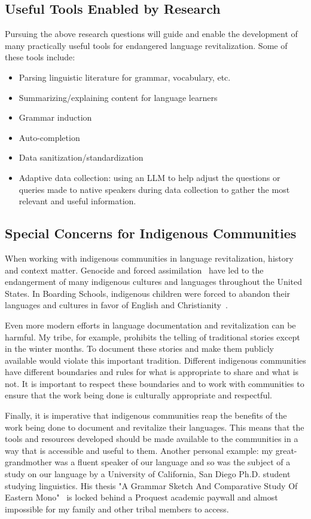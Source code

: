 \documentclass{article}
\begin{document}
\subsection*{Useful Tools Enabled by Research}
Pursuing the above research questions will guide and enable the development of many practically useful tools for endangered language revitalization.
Some of these tools include:
\begin{itemize}
    \item Parsing linguistic literature for grammar, vocabulary, etc.
    \item Summarizing/explaining content for language learners
    \item Grammar induction
    \item Auto-completion
    \item Data sanitization/standardization
    \item Adaptive data collection: using an LLM to help adjust the questions or queries made to native speakers during data collection to gather the most relevant and useful information.
\end{itemize}

\subsection*{Special Concerns for Indigenous Communities}
When working with indigenous communities in language revitalization, history and context matter.
Genocide and forced assimilation~\cite{genocide} have led to the endangerment of many indigenous cultures and languages throughout the United States.
In Boarding Schools, indigenous children were forced to abandon their languages and cultures in favor of English and Christianity~\cite{to-remain-an-indian}.

Even more modern efforts in language documentation and revitalization can be harmful.
My tribe, for example, prohibits the telling of traditional stories except in the winter months.
To document these stories and make them publicly available would violate this important tradition.
Different indigenous communities have different boundaries and rules for what is appropriate to share and what is not.
It is important to respect these boundaries and to work with communities to ensure that the work being done is culturally appropriate and respectful.

Finally, it is imperative that indigenous communities reap the benefits of the work being done to document and revitalize their languages.
This means that the tools and resources developed should be made available to the communities in a way that is accessible and useful to them.
Another personal example: my great-grandmother was a fluent speaker of our language and so was the subject of a study on our language by a University of California, San Diego Ph.D. student studying linguistics.
His thesis "A Grammar Sketch And Comparative Study Of Eastern Mono"~\cite{mnr_grammar} is locked behind a Proquest academic paywall and almost impossible for my family and other tribal members to access.
\end{document}
